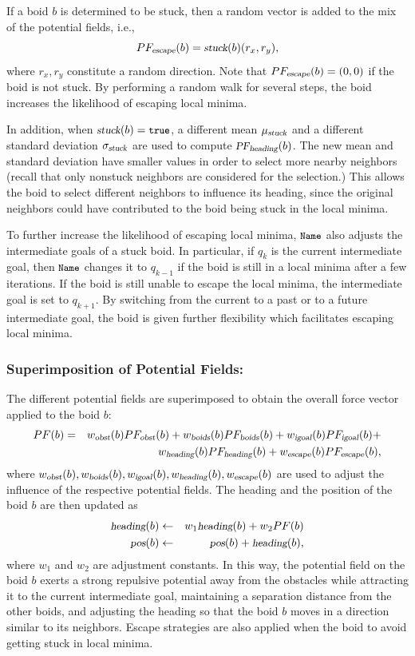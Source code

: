 \documentclass{llncs}
\newcommand{\Acronym}[1]{\ensuremath{{\small{\texttt{#1}}}}}
\newcommand{\Constant}[1]{\ensuremath{\small{\texttt{#1}}}}
\newcommand{\Var}[1]{\ensuremath{{\small{\textsl{#1}}}}}
\newcommand{\True}{\Constant{true}}
\newcommand{\Name}{\Acronym{Name}}
\begin{document}
If a boid $b$ is determined to be stuck, then a random vector is added
to the mix of the potential fields, i.e.,
$$
PF_\Var{escape}(b) = \Var{stuck}(b) (r_x, r_y),
$$
where $r_x, r_y$ constitute a random direction. Note that
$PF_\Var{escape}(b) = (0, 0)$ if the boid is not stuck. By performing a random walk for
several steps, the boid increases the likelihood of escaping local
minima.

In addition, when $\Var{stuck}(b) = \True$, a different mean
$\mu_\Var{stuck}$ and a different standard deviation
$\sigma_\Var{stuck}$ are used to compute
$\Var{PF}_\Var{heading}(b)$. The new mean and standard deviation have
smaller values in order to select more nearby neighbors (recall that
only nonstuck neighbors are considered for the selection.)  This
allows the boid to select different neighbors to influence its
heading, since the original neighbors could have contributed to the boid being
stuck in the local minima.

To further increase the likelihood of escaping local minima, $\Name$
also adjusts the intermediate goals of a stuck boid. In
particular, if $q_k$ is the current intermediate goal, then $\Name$
changes it to $q_{k-1}$ if the boid is still in a local minima after a
few iterations.  If the boid is still unable to escape the local
minima, the intermediate goal is set to $q_{k+1}$. By switching from
the current to a past or to a future intermediate goal, the boid is
given further flexibility which facilitates escaping local minima.


\subsubsection{Superimposition of Potential Fields:}
\label{sec:All}
The different potential fields are superimposed to obtain the overall force
vector applied to the boid $b$: 
\begin{eqnarray*}
PF(b) &= &w_\Var{obst}(b) PF_\Var{obst}(b) +
        w_\Var{boids}(b) PF_\Var{boids}(b) +
        w_\Var{igoal}(b) PF_\Var{igoal}(b) +\\
      &&  w_\Var{heading}(b) PF_\Var{heading}(b) +
       w_\Var{escape}(b) PF_\Var{escape}(b),
\end{eqnarray*}
where $w_\Var{obst}(b), w_\Var{boids}(b), w_\Var{igoal}(b),
w_\Var{heading}(b), w_\Var{escape}(b)$ are used to adjust the influence of the respective
potential fields. The heading and the position of the boid $b$ are then updated as
\begin{eqnarray*}
\Var{heading}(b) &\leftarrow& w_1 \Var{heading}(b) + w_2 PF(b)\\
\Var{pos}(b) &\leftarrow& \Var{pos}(b) + \Var{heading}(b),
\end{eqnarray*}
where $w_1$ and $w_2$ are adjustment constants. In this way, the
potential field on the boid $b$ exerts a strong repulsive potential
away from the obstacles while attracting it to the current intermediate
goal, maintaining a separation distance from the other boids, and
adjusting the heading so that the boid $b$ moves in a direction
similar to its neighbors. Escape strategies are also applied when the
boid to avoid getting stuck in local minima.
\end{document}

